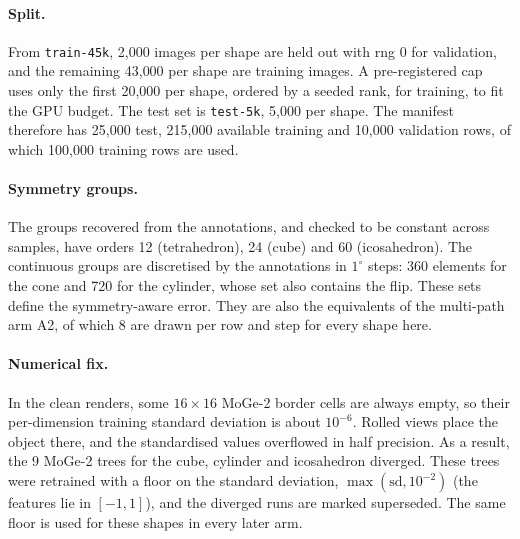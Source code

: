 \paragraph{Split.}
From \texttt{train-45k}, 2{,}000 images per shape are held out with rng 0 for validation, and the remaining 43{,}000 per shape are training images. A pre-registered cap uses only the first 20{,}000 per shape, ordered by a seeded rank, for training, to fit the GPU budget. The test set is \texttt{test-5k}, 5{,}000 per shape. The manifest therefore has 25{,}000 test, 215{,}000 available training and 10{,}000 validation rows, of which 100{,}000 training rows are used.

\paragraph{Symmetry groups.}
The groups recovered from the annotations, and checked to be constant across samples, have orders 12 (tetrahedron), 24 (cube) and 60 (icosahedron). The continuous groups are discretised by the annotations in $1^\circ$ steps: 360 elements for the cone and 720 for the cylinder, whose set also contains the flip.
These sets define the symmetry-aware error. They are also the equivalents of the multi-path arm A2, of which 8 are drawn per row and step for every shape here.

\paragraph{Numerical fix.}
In the clean renders, some $16\times16$ MoGe-2 border cells are always empty, so their per-dimension training standard deviation is about $10^{-6}$. Rolled views place the object there, and the standardised values overflowed in half precision. As a result, the 9 MoGe-2 trees for the cube, cylinder and icosahedron diverged. These trees were retrained with a floor on the standard deviation, $\max(\mathrm{sd},10^{-2})$ (the features lie in $[-1,1]$), and the diverged runs are marked superseded. The same floor is used for these shapes in every later arm.

